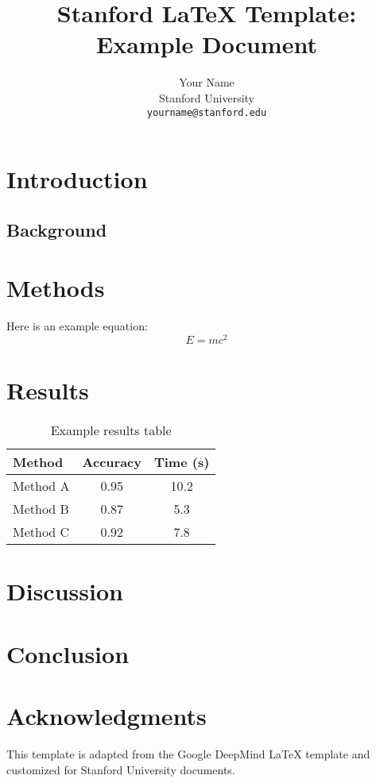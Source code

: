 \documentclass[11pt, a4paper, logo]{stanford}
\title{Stanford LaTeX Template: Example Document}
\author{Your Name\\
Stanford University\\
\texttt{yourname@stanford.edu}}
\begin{document}
\maketitle

\tableofcontents

\section{Introduction}

\lipsum[1-2]

\subsection{Background}

\lipsum[3]

\section{Methods}

Here is an example equation:
\begin{equation}
E = mc^2
\end{equation}

\lipsum[4]

\section{Results}

\begin{table}[h]
\centering
\caption{Example results table}
\label{tab:example}
\begin{tabular}{lcc}
\toprule
Method & Accuracy & Time (s) \\
\midrule
Method A & 0.95 & 10.2 \\
Method B & 0.87 & 5.3 \\
Method C & 0.92 & 7.8 \\
\bottomrule
\end{tabular}
\end{table}

\lipsum[6]

\section{Discussion}

\lipsum[7-8]

\section{Conclusion}

\lipsum[9]

\section*{Acknowledgments}

This template is adapted from the Google DeepMind LaTeX template and customized for Stanford University documents.
\end{document}
